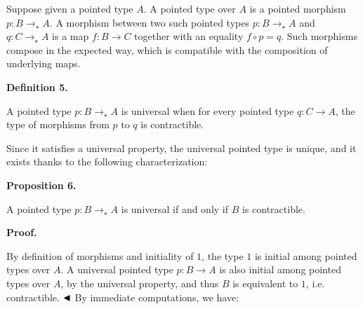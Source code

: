 Suppose given a pointed type $A$. A pointed type over $A$ is a pointed morphism $p:B\to_{\star{}}A$. A morphism between two such pointed types $p:B\to_{\star{}}A$ and $q:C\to_{\star{}}A$ is a map $f:B\to C$ together with an equality $f\circ p=q$. Such morphisms compose in the expected way, which is compatible with the composition of underlying maps.\par
 
 
 
\par\medskip\noindent\textbf{Definition 5.}\par
 
 
A pointed type $p:B\to_{\star{}}A$ is universal when for every pointed type $q:C\to A$, the type of morphisms from $p$ to $q$ is contractible.\par
 
 
 
 
Since it satisfies a universal property, the universal pointed type is unique, and it exists thanks to the following characterization:\par
 
 
 
\par\medskip\noindent\textbf{Proposition 6.}\par
 
 
A pointed type $p:B\to_{\star{}}A$ is universal if and only if $B$ is contractible.\par
 
 
 
 
\par\medskip\noindent\textbf{Proof.}\par
 
 
By definition of morphisms and initiality of $1$, the type $1$ is initial among pointed types over $A$. A universal pointed type $p:B\to A$ is also initial among pointed types over $A$, by the universal property, and thus $B$ is equivalent to $1$, i.e. contractible. $\hfill\blacktriangleleft$ By immediate computations, we have:\par
 
